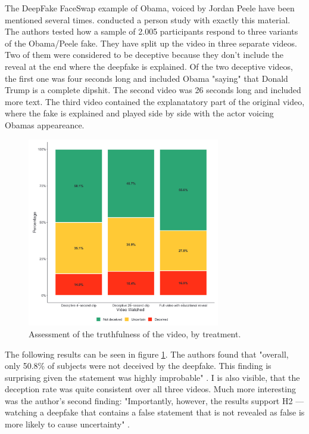 \documentclass[
  a4paper,  %
  twoside,  %
  bibliography=totoc,
  headsepline,
  cleardoublepage=empty,
  parskip=half,
  draft=false
]{scrbook}
\begin{document}
The DeepFake FaceSwap example of Obama, voiced by Jordan Peele have been mentioned several times. \citeauthor{vaccariDeepfakesDisinformationExploring2020} conducted a person study with exactly this material. The authors tested how a sample of 2.005 participants respond to three variants of the Obama/Peele fake. They have split up the video in three separate videos. Two of them were considered to be deceptive because they don't include the reveal at the end where the deepfake is explained. Of the two deceptive videos, the first one was four seconds long and included Obama "saying" that Donald Trump is a complete dipshit. The second video was 26 seconds long and included more text. The third video contained the explanatatory part of the original video, where the fake is explained and played side by side with the actor voicing Obamas appeareance.
\begin{figure}[h]
  \centering
  \includegraphics[width=0.75\textwidth]{./graphics/images/obamafake.png}
  \caption{Assessment of the truthfulness of the video, by treatment. \cite{vaccariDeepfakesDisinformationExploring2020}}
  \label{fig:obamafake-eval}
\end{figure}
The following results can be seen in figure \ref{fig:obamafake-eval}. The authors found that "overall, only 50.8\% of subjects were not deceived by the deepfake. This finding is surprising given the statement was highly improbable" \cite{vaccariDeepfakesDisinformationExploring2020}. 
I is also visible, that the deception rate was quite consistent over all three videos. Much more interesting was the author's second finding: "Importantly, however, the results support H2 — watching a deepfake that contains a false statement that is not revealed as false is more likely to cause uncertainty" \cite{vaccariDeepfakesDisinformationExploring2020}. \\
\end{document}
